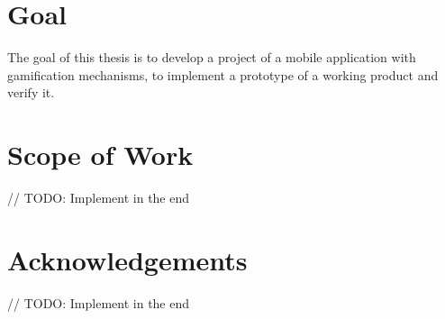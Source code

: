 \section{Goal}\label{sec:introduction:goal}
The goal of this thesis is to develop a project of a mobile application with gamification mechanisms, to implement a prototype of a working product and verify it.


\section{Scope of Work}\label{sec:introduction:scope}
// TODO: Implement in the end


\section{Acknowledgements}\label{sec:introduction:acknowledgments}
// TODO: Implement in the end
